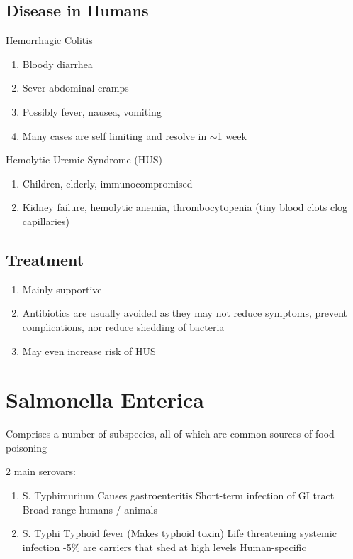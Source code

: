 \documentclass{notes}
\begin{document}
\subsection*{Disease in Humans}
Hemorrhagic Colitis
\begin{enumerate}
    \item Bloody diarrhea
    \item Sever abdominal cramps
    \item Possibly fever, nausea, vomiting
    \item Many cases are self limiting and resolve in \(\sim\)1 week
\end{enumerate}

Hemolytic Uremic Syndrome (HUS)
\begin{enumerate}
    \item Children, elderly, immunocompromised
    \item Kidney failure, hemolytic anemia, thrombocytopenia (tiny blood clots clog capillaries)
\end{enumerate}

\subsection*{Treatment}
\begin{enumerate}
    \item Mainly supportive
    \item Antibiotics are usually avoided as they may not reduce symptoms, prevent complications, nor reduce shedding of bacteria
    \item May even increase risk of HUS
\end{enumerate}

\section*{Salmonella Enterica}
Comprises a number of subspecies, all of which are common sources of food poisoning

2 main serovars:
\begin{enumerate}
    \item S. Typhimurium
    \subitem Causes gastroenteritis
    \subitem Short-term infection of GI tract
    \subitem Broad range humans / animals
    \item S. Typhi
    \subitem Typhoid fever (Makes typhoid toxin)
    \subitem Life threatening systemic infection
    -5\% are carriers that shed at high levels
    \subitem Human-specific
\end{enumerate}
\end{document}

